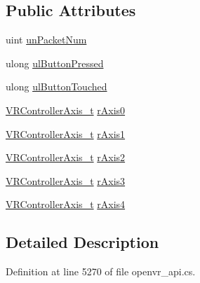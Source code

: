 \subsection*{Public Attributes}
\begin{DoxyCompactItemize}
\item 
uint \mbox{\hyperlink{struct_valve_1_1_v_r_1_1_v_r_controller_state__t___packed_a5a26fa7f4b5e10ba35c51f384773fbae}{un\+Packet\+Num}}
\item 
ulong \mbox{\hyperlink{struct_valve_1_1_v_r_1_1_v_r_controller_state__t___packed_af267c4733d539cf3e62ad37d58a34829}{ul\+Button\+Pressed}}
\item 
ulong \mbox{\hyperlink{struct_valve_1_1_v_r_1_1_v_r_controller_state__t___packed_ad3ea022396546e8d29925c1aab78ead8}{ul\+Button\+Touched}}
\item 
\mbox{\hyperlink{struct_valve_1_1_v_r_1_1_v_r_controller_axis__t}{V\+R\+Controller\+Axis\+\_\+t}} \mbox{\hyperlink{struct_valve_1_1_v_r_1_1_v_r_controller_state__t___packed_a6f6957102bee06391a39b353870e4229}{r\+Axis0}}
\item 
\mbox{\hyperlink{struct_valve_1_1_v_r_1_1_v_r_controller_axis__t}{V\+R\+Controller\+Axis\+\_\+t}} \mbox{\hyperlink{struct_valve_1_1_v_r_1_1_v_r_controller_state__t___packed_a726d09b52880a41564dc36a699b98e3d}{r\+Axis1}}
\item 
\mbox{\hyperlink{struct_valve_1_1_v_r_1_1_v_r_controller_axis__t}{V\+R\+Controller\+Axis\+\_\+t}} \mbox{\hyperlink{struct_valve_1_1_v_r_1_1_v_r_controller_state__t___packed_a3ebdd5e5211e4beb87269e323fe29f29}{r\+Axis2}}
\item 
\mbox{\hyperlink{struct_valve_1_1_v_r_1_1_v_r_controller_axis__t}{V\+R\+Controller\+Axis\+\_\+t}} \mbox{\hyperlink{struct_valve_1_1_v_r_1_1_v_r_controller_state__t___packed_a0eae83f0b068da58e8d8f9c29d1e4d4b}{r\+Axis3}}
\item 
\mbox{\hyperlink{struct_valve_1_1_v_r_1_1_v_r_controller_axis__t}{V\+R\+Controller\+Axis\+\_\+t}} \mbox{\hyperlink{struct_valve_1_1_v_r_1_1_v_r_controller_state__t___packed_a3bd747f5648156705433b72bf3da3291}{r\+Axis4}}
\end{DoxyCompactItemize}


\subsection{Detailed Description}


Definition at line 5270 of file openvr\+\_\+api.\+cs.



